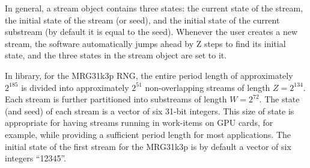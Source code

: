 \documentclass[article,nojss]{jss}\usepackage[]{graphicx}\usepackage[]{color}
\begin{document}
In general, a stream object contains three states: the current state of the stream, the initial state of the stream (or seed), and the initial state of the current substream (by default it is equal to the seed). Whenever the user creates a new stream, the software automatically jumps ahead by Z steps to find its initial state, and the three states in the stream object are set to it. 

In  library, for the MRG31k3p RNG, the entire period length of approximately $2^{185}$ is divided into approximately $2^{51}$ non-overlapping streams of length $Z = 2^{134}$. Each stream is further partitioned into substreams of length $W = 2^{72}$. The state (and seed) of each stream is a vector of six 31-bit integers. This size of state is appropriate for having streams running in work-items on GPU cards, for example, while providing a sufficient period length for most applications. The initial state of the first stream for the MRG31k3p is by default a vector of six integers ``12345''.
\end{document}
